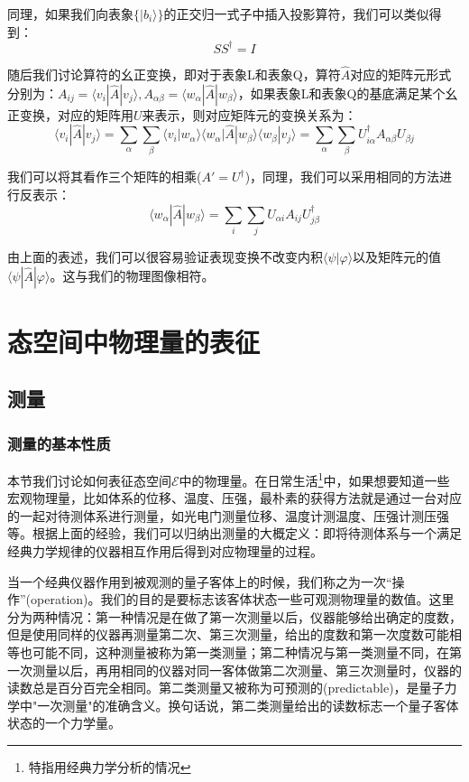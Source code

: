     同理，如果我们向表象$\{|b_i\rangle\}$的正交归一式子中插入投影算符，我们可以类似得到：
     \begin{equation}
        S S^\dagger=I
    \end{equation}

   随后我们讨论算符的幺正变换，即对于表象L和表象Q，算符$\hat{A}$对应的矩阵元形式分别为：$A_{ij}=\langle v_i|\hat{A}|v_j\rangle,A_{\alpha\beta}=\langle w_\alpha|\hat{A}|w_\beta\rangle$，如果表象L和表象Q的基底满足某个幺正变换，对应的矩阵用$U$来表示，则对应矩阵元的变换关系为：
   \begin{equation}
       \langle v_i|\hat{A}|v_j\rangle =\sum_\alpha\sum_\beta \langle v_i|w_\alpha\rangle\langle w_\alpha|\hat{A}|w_\beta\rangle\langle w_\beta|v_j\rangle=\sum_\alpha\sum_\beta U^\dagger_{i\alpha}A_{\alpha\beta}U_{\beta j}
   \end{equation}
   
   我们可以将其看作三个矩阵的相乘($A'=U^\dagger$)，同理，我们可以采用相同的方法进行反表示：
   \begin{equation}
        \langle w_\alpha|\hat{A}|w_\beta\rangle=\sum_i\sum_j U_{\alpha i}A_{ij}U^\dagger_{j\beta}
   \end{equation}
   
   由上面的表述，我们可以很容易验证表现变换不改变内积$\langle\psi|\varphi\rangle$以及矩阵元的值$\langle\psi|\hat{A}|\varphi\rangle$。这与我们的物理图像相符。
\section{态空间中物理量的表征}
    \subsection{测量}
        \subsubsection{测量的基本性质}
        本节我们讨论如何表征态空间$\mathscr{E}$中的物理量。在日常生活\footnote{特指用经典力学分析的情况}中，如果想要知道一些宏观物理量，比如体系的位移、温度、压强，最朴素的获得方法就是通过一台对应的一起对待测体系进行测量，如光电门测量位移、温度计测温度、压强计测压强等。根据上面的经验，我们可以归纳出测量的大概定义：即将待测体系与一个满足经典力学规律的仪器相互作用后得到对应物理量的过程。
        
        当一个经典仪器作用到被观测的量子客体上的时候，我们称之为一次“操作”(operation)。我们的目的是要标志该客体状态一些可观测物理量的数值。这里分为两种情况：第一种情况是在做了第一次测量以后，仪器能够给出确定的度数，但是使用同样的仪器再测量第二次、第三次测量，给出的度数和第一次度数可能相等也可能不同，这种测量被称为第一类测量；第二种情况与第一类测量不同，在第一次测量以后，再用相同的仪器对同一客体做第二次测量、第三次测量时，仪器的读数总是百分百完全相同。第二类测量又被称为可预测的(predictable)，是量子力学中"一次测量"的准确含义。换句话说，第二类测量给出的读数标志一个量子客体状态的一个力学量。
        
